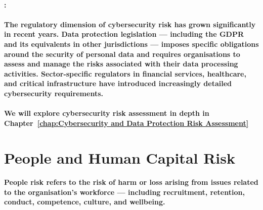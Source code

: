 \paragraph{\textbf{:}}
\begin{itemize}
\end{itemize}
\paragraph{The regulatory dimension of cybersecurity risk has grown significantly in recent years. Data protection legislation — including the GDPR and its equivalents in other jurisdictions — imposes specific obligations around the security of personal data and requires organisations to assess and manage the risks associated with their data processing activities. Sector-specific regulators in financial services, healthcare, and critical infrastructure have introduced increasingly detailed cybersecurity requirements.}
\paragraph{We will explore cybersecurity risk assessment in depth in Chapter~\ref{chap:Cybersecurity and Data Protection Risk Assessment}}

\section{People and Human Capital Risk}
\paragraph{People risk refers to the risk of harm or loss arising from issues related to the organisation's workforce — including recruitment, retention, conduct, competence, culture, and wellbeing.}
